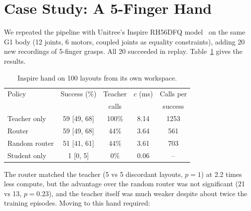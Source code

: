 \documentclass[10pt,twocolumn]{article}
\begin{document}
\section{Case Study: A 5-Finger Hand}
We repeated the pipeline with Unitree's Inspire RH56DFQ model~\cite{unitreeros} on the same G1 body (12 joints, 6 motors,
coupled joints as equality constraints), adding 20 new recordings of 5-finger grasps. All 20 succeeded in replay.
Table~\ref{tab:inspire} gives the results.

\begin{table}[t]
\centering\small
\caption{Inspire hand on 100 layouts from its own workspace.}
\label{tab:inspire}
\setlength{\tabcolsep}{3pt}
\begin{tabular}{@{}lcccc@{}}
\toprule
Policy & Success (\%) & Teacher & $c$ (ms) & Calls per\\
 & & calls & & success\\
\midrule
Teacher only & 59 [49, 68] & 100\% & 8.14 & 1253\\
Router & 59 [49, 68] & 44\% & 3.64 & 561\\
Random router & 51 [41, 61] & 44\% & 3.61 & 703\\
Student only & 1 [0, 5] & 0\% & 0.06 & --\\
\bottomrule
\end{tabular}
\end{table}

The router matched the teacher (5 vs 5 discordant layouts, $p = 1$) at 2.2 times less compute, but the advantage over the
random router was not significant (21 vs 13, $p = 0.23$), and the teacher itself was much weaker despite about twice
the training episodes. Moving to this hand required:
\end{document}
